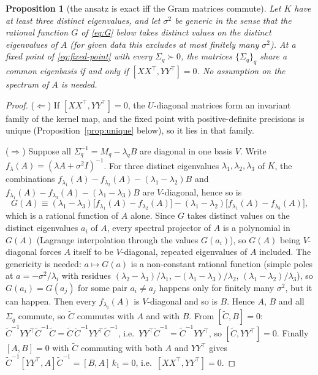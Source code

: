 \documentclass[11pt,a4paper]{article}
\newcommand{\Ct}{\tilde C}
\newtheorem{proposition}{Proposition}
\begin{document}
\begin{proposition}[the ansatz is exact iff the Gram matrices commute]
\label{prop:iff}
Let $K$ have at least three distinct eigenvalues, and let $\sigma^2$ be generic in the sense that the rational function $G$ of \eqref{eq:G} below takes distinct values on the distinct eigenvalues of $A$ (for given data this excludes at most finitely many $\sigma^2$). At a fixed point of \eqref{eq:fixed-point} with every $\Sigma_q \succ 0$, the matrices $\{\Sigma_q\}_q$ share a common eigenbasis if and only if $[XX^\top, YY^\top] = 0$. No assumption on the spectrum of $A$ is needed.
\end{proposition}
\begin{proof}
($\Leftarrow$) If $[XX^\top, YY^\top]=0$, the $U$-diagonal matrices form an invariant family of the kernel map, and the fixed point with positive-definite precisions is unique (Proposition~\ref{prop:unique} below), so it lies in that family.

($\Rightarrow$) Suppose all $\Sigma_q^{-1} = M_q - \lambda_q B$ are diagonal in one basis $V$. Write $f_\lambda(A) = (\lambda A + \sigma^2 I)^{-1}$. For three distinct eigenvalues $\lambda_1,\lambda_2,\lambda_3$ of $K$, the combinations
$f_{\lambda_1}(A) - f_{\lambda_2}(A) - (\lambda_1-\lambda_2)B$ and $f_{\lambda_1}(A) - f_{\lambda_3}(A) - (\lambda_1-\lambda_3)B$ are $V$-diagonal, hence so is
\begin{equation}
  G(A) \equiv (\lambda_1-\lambda_3)\big[f_{\lambda_1}(A) - f_{\lambda_2}(A)\big] - (\lambda_1-\lambda_2)\big[f_{\lambda_1}(A) - f_{\lambda_3}(A)\big],
  \label{eq:G}
\end{equation}
which is a rational function of $A$ alone. Since $G$ takes distinct values on the distinct eigenvalues $a_i$ of $A$, every spectral projector of $A$ is a polynomial in $G(A)$ (Lagrange interpolation through the values $G(a_i)$), so $G(A)$ being $V$-diagonal forces $A$ itself to be $V$-diagonal, repeated eigenvalues of $A$ included. The genericity is needed: $a \mapsto G(a)$ is a non-constant rational function (simple poles at $a = -\sigma^2/\lambda_i$ with residues $(\lambda_2-\lambda_3)/\lambda_1$, $-(\lambda_1-\lambda_3)/\lambda_2$, $(\lambda_1-\lambda_2)/\lambda_3$), so $G(a_i) = G(a_j)$ for some pair $a_i \ne a_j$ happens only for finitely many $\sigma^2$, but it can happen. Then every $f_{\lambda_q}(A)$ is $V$-diagonal and so is $B$. Hence $A$, $B$ and all $\Sigma_q$ commute, so $\Ct$ commutes with $A$ and with $B$. From $[\Ct, B] = 0$: $\Ct^{-1} YY^\top \Ct^{-1}\Ct = \Ct\,\Ct^{-1} YY^\top \Ct^{-1}$, i.e.\ $YY^\top \Ct^{-1} = \Ct^{-1} YY^\top$, so $[\Ct, YY^\top]=0$. Finally $[A,B]=0$ with $\Ct$ commuting with both $A$ and $YY^\top$ gives $\Ct^{-1}[YY^\top, A]\Ct^{-1} = [B,A]\,k_1 = 0$, i.e.\ $[XX^\top, YY^\top] = 0$.
\end{proof}
\end{document}
